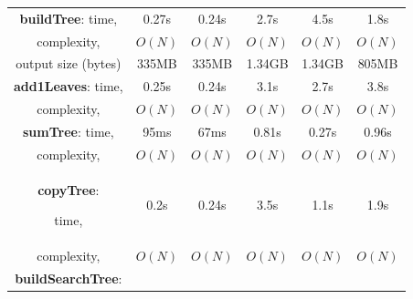 \begin{table}
\begin{center}
\begin{tabular}{ |c|c|c|c|c|c| }
        {\bf buildTree}:
        time,               & 0.27s     &  0.24s    & 2.7s &  4.5s  & 1.8s   \\
        complexity,         & $O(N)$    &  $O(N)$   &  $O(N)$ & $O(N)$  &  $O(N)$ \\
        output size (bytes) & 335MB     &  335MB    &  1.34GB &  1.34GB &  805MB       \\
        \hline

        {\bf add1Leaves}:
        time,               & 0.25s     &  0.24s  & 3.1s     & 2.7s    &  3.8s  \\
        complexity,         & $O(N)$    &  $O(N)$ & $O(N)$   & $O(N)$  &  $O(N)$ \\
        \hline
            {\bf sumTree}:
            time,               & 95ms     & 67ms     & 0.81s   &  0.27s  &  0.96s  \\
            complexity,         & $O(N)$   & $O(N)$   & $O(N)$  & $O(N)$  &  $O(N)$ \\
            \hline
                {\bf copyTree}:

                time,               & 0.2s      & 0.24s   & 3.5s   &  1.1s   &  1.9s       \\
                complexity,         & $O(N)$    & $O(N)$  & $O(N)$ & $O(N)$  &  $O(N)$ \\

                \hline
                \hline
                    {\bf buildSearchTree}:


\end{tabular}
\end{center}
\end{table}
